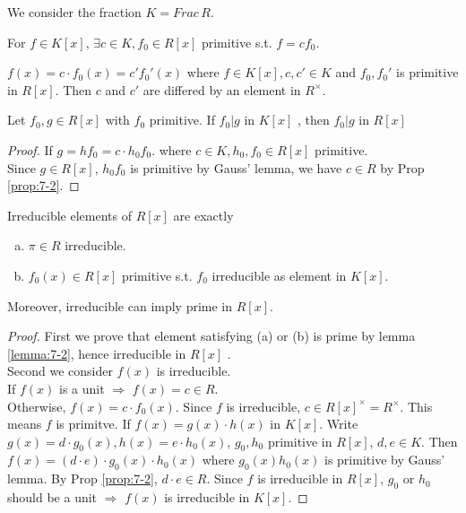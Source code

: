 We consider the fraction  $ K=Frac\, R $.
\begin{lemma}
    For  $ f\in K[x] $,  $ \exists c\in K, f_0\in R[x] $ primitive s.t.  $ f=cf_0 $.  
\end{lemma} 
\begin{proposition}\label{prop:7-2}
     $ f(x)=c\cdot f_0(x)=c'f_0'(x) $ where  $ f\in K[x],c,c'\in K $ and  $ f_0,f_0' $ is primitive in  $ R[x] $. Then  $ c $ and  $ c'  $ are differed by an element in  $ R^\times $.      
\end{proposition}
\begin{lemma}\label{lemma:7-2}
    Let  $ f_0,g\in R[x] $ with  $ f_0  $ primitive. 
    If  $ f_0|g  $ in  $ K[x]  $ ,   then  $ f_0|g  $ in  $ R[x]  $ 
\end{lemma}
\begin{proof}
    If  $ g=hf_0=c\cdot h_0f_0 $. where  $ c\in K,h_0,f_0\in R[x] $ primitive.\\
    Since  $ g\in R[x] $, $ h_0f_0 $ is primitive by Gauss' lemma, we have   $ c\in R $ by Prop \ref{prop:7-2}.   
\end{proof}
\begin{theorem}
    Irreducible elements of  $ R[x] $ are exactly
    \begin{enumerate}[(a)]
        \item  $ \pi\in R $ irreducible.
        \item  $ f_0(x)\in R[x] $ primitive s.t.  $ f_0  $ irreducible as element in  $ K[x] $.  
    \end{enumerate}
    Moreover, irreducible can imply prime in  $ R[x] $. 
\end{theorem}
\begin{proof}
    First we prove that element satisfying (a) or (b) is prime by lemma \ref{lemma:7-2}, hence irreducible in  $ R[x] $ .\\
    Second we consider  $ f(x)  $ is irreducible.\\
    If  $ f(x)  $ is a unit  $ \Rightarrow  $  $ f(x)=c\in R $.\\
    Otherwise,  $ f(x)=c\cdot f_0(x) $. Since  $ f  $ is irreducible,  $ c\in R[x]^\times=R^\times $. This means  $ f  $ is primitve. If  $ f(x)=g(x)\cdot h(x)  $ in  $ K[x] $. Write  $ g(x)=d\cdot g_0(x),h(x)=e\cdot h_0(x) $, $ g_0,h_0  $ primitive in  $ R[x] $,  $ d,e\in K $.  Then  $ f(x)=(d\cdot e)\cdot g_0(x)\cdot h_0(x) $ where  $ g_0(x)h_0(x)  $ is primitive by Gauss' lemma. By Prop \ref{prop:7-2},  $ d\cdot e\in R $. Since  $ f  $ is irreducible in  $ R[x] $,  $ g_0  $ or  $ h_0  $ should be a unit  $ \Rightarrow $    $ f(x)  $ is irreducible in  $ K[x] $. 
\end{proof}
